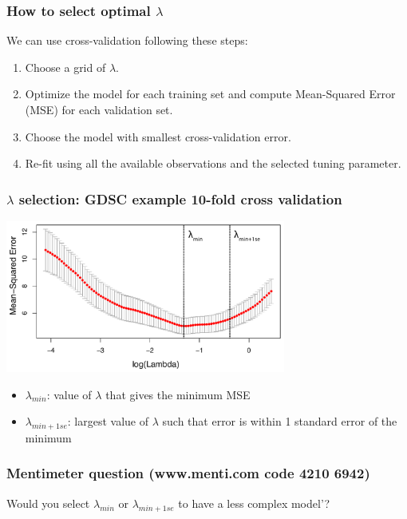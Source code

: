 \documentclass[notes]{beamer}          %
\begin{document}
\begin{frame}
\frametitle{How to select optimal $\lambda$}

We can use cross-validation following these steps:
\begin{enumerate}
  \item Choose a grid of $\lambda$.
  \item Optimize the model for each training set and compute Mean-Squared Error (MSE) for each validation set.
  \item Choose the model with smallest cross-validation error.
  \item Re-fit using all the available observations and the selected tuning parameter.
\end{enumerate}

\end{frame}

\begin{frame}
\frametitle{$\lambda$ selection: GDSC example 10-fold cross validation}

\begin{center}
\includegraphics[height=5cm]{../figures/week_2_linear_models/Lasso_MSE_crossvalidation.pdf}
\end{center}

\vspace{-2mm} 

\begin{itemize}
    \item $\lambda_{min}$: value of $\lambda$ that gives the minimum MSE
    \item $\lambda_{min+1se}$: largest value of $\lambda$ such that error is within 1 standard error of the minimum
\end{itemize}

\end{frame}

\begin{frame}
\frametitle{Mentimeter question (www.menti.com code 4210 6942)}

Would you select $\lambda_{min}$ or $\lambda_{min+1se}$ to have a less complex model'?

\end{frame}
\end{document}
